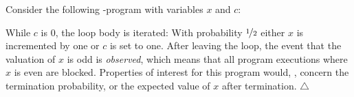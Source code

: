 \begin{example}\label{ex:simple}
	Consider the following \cpGCL-program with variables $x$ and $c$:
	
\begin{CenteredBox}
				
			\end{CenteredBox}

\noindent While $c$ is $0$, the loop body is iterated: With probability $\nicefrac 1 2$ either $x$ is incremented by one or $c$ is set to one. After leaving the loop, the event that the valuation of $x$ is odd is \emph{observed}, which means that all program executions where $x$ is even are blocked. 
	Properties of interest for this program would, \eg, concern the termination probability, or the expected value of $x$ after termination.
\hfill$\triangle$
\end{example}






